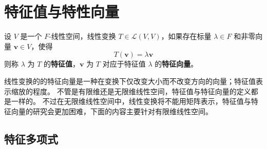 \section{特征值与特性向量}

\begin{definition}
    设 $V$ 是一个 $F$-线性空间，线性变换 $T\in \mathcal{L}(V,V)$，如果存在标量 $\lambda\in F$ 和非零向量 $\mathbf{v}\in V$，使得
    \[
        T(\mathbf{v}) = \lambda \mathbf{v}
    \]
    则称 $\lambda$ 为 $T$ 的\textbf{特征值}，$\mathbf{v}$ 为 $T$ 对应于特征值 $\lambda$ 的\textbf{特征向量}。
    \label{def:eigenvalue_and_eigenvector}
\end{definition}

\begin{note}
    线性变换的的特征向量是一种在变换下仅改变大小而不改变方向的向量；特征值表示缩放的程度。
    不管是有限维还是无限维线性空间，特征值与特征向量的定义都是一样的。
    不过在无限维线性空间中，线性变换将不能用矩阵表示，特征值与特征向量的研究会更加困难，下面的内容主要针对有限维线性空间。
\end{note}

\vspace{1em}

\subsection{特征多项式}



\newpage